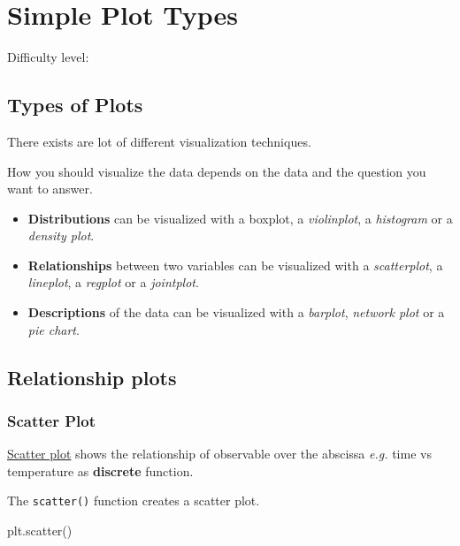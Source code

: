 \documentclass[
  letterpaper,
  DIV=11,
  numbers=noendperiod]{scrreprt}
\newenvironment{Shaded}{\begin{snugshade}}{\end{snugshade}}
\newcommand{\NormalTok}[1]{\textcolor[rgb]{0.00,0.23,0.31}{#1}}
\begin{document}
\chapter{Simple Plot Types}\label{simple-plot-types}

Difficulty level: { }

\section*{Types of Plots}\label{types-of-plots}


There exists are lot of different visualization techniques.

How you should visualize the data depends on the data and the question
you want to answer.

\begin{itemize}
\item
  \textbf{Distributions} can be visualized with a boxplot, a
  \emph{violinplot}, a \emph{histogram} or a \emph{density plot}.
\item
  \textbf{Relationships} between two variables can be visualized with a
  \emph{scatterplot}, a \emph{lineplot}, a \emph{regplot} or a
  \emph{jointplot}.
\item
  \textbf{Descriptions} of the data can be visualized with a
  \emph{barplot}, \emph{network plot} or a \emph{pie chart}.
\end{itemize}

\section{Relationship plots}\label{relationship-plots}

\subsection{Scatter Plot}\label{scatter-plot}

\href{https://matplotlib.org/stable/api/_as_gen/matplotlib.pyplot.scatter.html}{Scatter
plot} shows the relationship of observable over the abscissa \emph{e.g.}
time vs temperature as \textbf{discrete} function.

The \texttt{scatter()} function creates a scatter plot.

\begin{Shaded}
\begin{Highlighting}[]
\NormalTok{plt.scatter()}
\end{Highlighting}
\end{Shaded}
\end{document}
